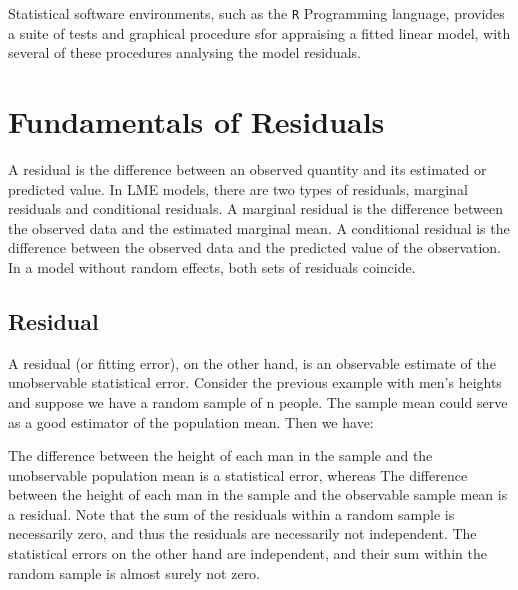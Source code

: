 \documentclass[Main.tex]{subfiles}
\begin{document}
	
	

Statistical software environments, such as the \texttt{R} Programming language, provides a suite of tests and graphical procedure sfor appraising a fitted linear model, with several 
of these procedures analysing the model residuals.

\bigskip 

\section{ Fundamentals of Residuals}


A residual is the difference between an observed quantity and its
estimated or predicted value. In LME models, there are two types
of residuals, marginal residuals and conditional residuals. A
marginal residual is the difference between the observed data and
the estimated marginal mean. A conditional residual is the
difference between the observed data and the predicted value of
the observation. In a model without random effects, both sets of
residuals coincide.

\subsection{Residual}
A residual (or fitting error), on the other hand, is an observable estimate of the unobservable statistical error. Consider the previous example with men's heights and suppose we have a random sample of n people. The sample mean could serve as a good estimator of the population mean. Then we have:

The difference between the height of each man in the sample and the unobservable population mean is a statistical error, whereas
The difference between the height of each man in the sample and the observable sample mean is a residual.
Note that the sum of the residuals within a random sample is necessarily zero, and thus the residuals are necessarily not independent. The statistical errors on the other hand are independent, and their sum within the random sample is almost surely not zero.
\end{document}
